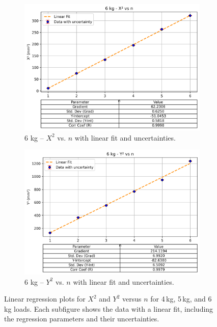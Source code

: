 \documentclass[a4paper,11pt]{article}
\begin{document}
\begin{figure}[H]
  \begin{subfigure}[b]{0.45\textwidth}
    \centering
    \includegraphics[width=\textwidth]{6kg_X2_vs_n_with_errorbar.png}
    \caption{6 kg -- \(X^2\) vs. \(n\) with linear fit and uncertainties.}
    \label{fig:6kgX2vsn}
  \end{subfigure}
  \hfill
  \begin{subfigure}[b]{0.45\textwidth}
    \centering
    \includegraphics[width=\textwidth]{6kg_Y2_vs_n_with_errorbar.png}
    \caption{6 kg -- \(Y^2\) vs. \(n\) with linear fit and uncertainties.}
    \label{fig:6kgY2vsn}
  \end{subfigure}
  
  \caption{Linear regression plots for \(X^2\) and \(Y^2\) versus \(n\) for 4\,kg, 5\,kg, and 6\,kg loads. Each subfigure shows the data with a linear fit, including the regression parameters and their uncertainties.}
  \label{fig:all_fits}
\end{figure}
\end{document}
